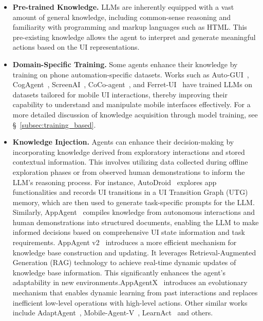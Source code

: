 \begin{itemize}
    \item \textbf{Pre-trained Knowledge.} LLMs are inherently equipped with a vast amount of general knowledge, including common-sense reasoning and familiarity with programming and markup languages such as HTML. This pre-existing knowledge allows the agent to interpret and generate meaningful actions based on the UI representations.
    
    \item \textbf{Domain-Specific Training.} Some agents enhance their knowledge by training on phone automation-specific datasets. Works such as Auto-GUI~\cite{zhang2023youautoui}, CogAgent~\cite{hong2024cogagent}, ScreenAI~\cite{baechler2024screenai}, CoCo-agent~\cite{ma2024coco}, and Ferret-UI~\cite{you2024ferret} have trained LLMs on datasets tailored for mobile UI interactions, thereby improving their capability to understand and manipulate mobile interfaces effectively. For a more detailed discussion of knowledge acquisition through model training, see \S\ \ref{subsec:training_based}.

    
    \item \textbf{Knowledge Injection.} Agents can enhance their decision-making by incorporating knowledge derived from exploratory interactions and stored contextual information. This involves utilizing data collected during offline exploration phases or from observed human demonstrations to inform the LLM's reasoning process. For instance, AutoDroid~\cite{wen2024autodroid} explores app functionalities and records UI transitions in a UI Transition Graph (UTG) memory, which are then used to generate task-specific prompts for the LLM. Similarly, AppAgent~\cite{zhang2023appagent} compiles knowledge from autonomous interactions and human demonstrations into structured documents, enabling the LLM to make informed decisions based on comprehensive UI state information and task requirements.
    AppAgent v2~\cite{li2024appagentv2} introduces a more efficient mechanism for knowledge base construction and updating. It leverages Retrieval-Augmented Generation (RAG) technology to achieve real-time dynamic updates of knowledge base information. This significantly enhances the agent's adaptability in new environments.AppAgentX~\cite{li2024appagentx} introduces an evolutionary mechanism that enables dynamic learning from past interactions and replaces inefficient low-level operations with high-level actions. Other similar works include AdaptAgent~\cite{verma2024adaptagent}, Mobile-Agent-V~\cite{wang2025mobileagentv}, LearnAct~\cite{liu2025learnact} and others.
\end{itemize}

